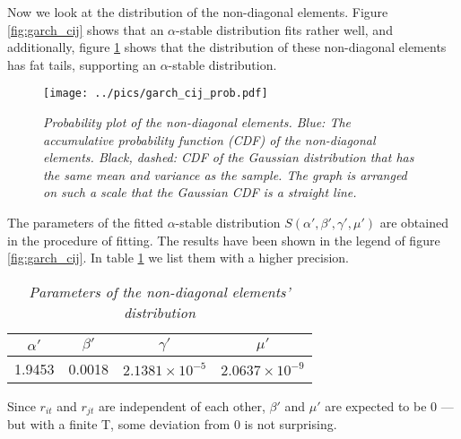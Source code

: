 \documentclass{report}
\begin{document}
Now we look at the distribution of the non-diagonal elements. Figure
\ref{fig:garch_cij} shows that an $\alpha$-stable distribution fits
rather well, and additionally, figure \ref{fig:garch_nondiag_probplot}
shows that the distribution of these non-diagonal elements has fat
tails, supporting an $\alpha$-stable distribution.
\begin{figure}[htb!]
  \centering
  \texttt{[image: ../pics/garch\_cij\_prob.pdf]}
    \caption{\small \it Probability plot of the non-diagonal
      elements. Blue: The accumulative probability function
      (CDF) of the non-diagonal elements. Black, dashed: CDF of the
      Gaussian distribution that has the same mean and variance as the
      sample. The graph is arranged on such a scale that the Gaussian
      CDF is a straight line.
    }
  \label{fig:garch_nondiag_probplot}
\end{figure}

The parameters of the fitted $\alpha$-stable distribution $S(\alpha',
\beta', \gamma', \mu')$ are obtained in the procedure of fitting. The
results have been shown in the legend of figure
\ref{fig:garch_cij}. In table \ref{tab:garch_wishart_cij_params} we
list them with a higher precision.
\begin{table}[htb!]
  \centering
  \begin{tabular}{|c|c|c|c|}
    \hline
    $\alpha'$ & $\beta'$ & $\gamma'$ & $\mu'$ \\
    \hline
    1.9453 & 0.0018 & $2.1381 \times 10^{-5}$ & $2.0637\times 10^{-9}$ \\
    \hline
  \end{tabular}
  \caption{\small \it Parameters of the non-diagonal elements' distribution}
  \label{tab:garch_wishart_cij_params}
\end{table}
Since $r_{it}$ and $r_{jt}$ are independent of each other, $\beta'$
and $\mu'$ are expected to be 0 --- but with a finite T, some deviation
from 0 is not surprising.
\end{document}
